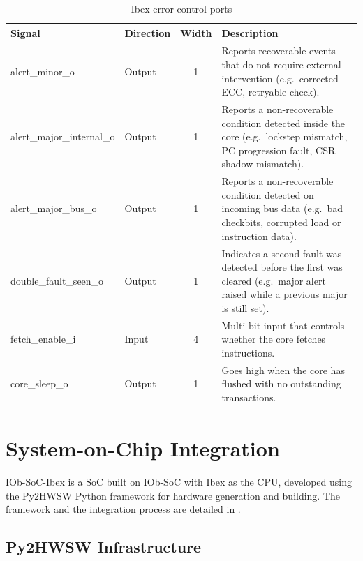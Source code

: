 \begin{table}[h]
\centering
\begin{tabularx}{\textwidth}{|l|l|c|X|}
\hline
\rowcolor{tableheader}\textbf{Signal} & \textbf{Direction} & \textbf{Width} & \textbf{Description} \\
\hline
\hline
alert\_minor\_o &
Output & 1 &
Reports recoverable events that do not require external intervention (e.g.\ corrected \ac{ECC}, retryable check). \\
\hline
alert\_major\_internal\_o &
Output & 1 &
Reports a non-recoverable condition detected inside the core (e.g.\ lockstep mismatch, \ac{PC} progression fault, \ac{CSR} shadow mismatch). \\
\hline
alert\_major\_bus\_o &
Output & 1 &
Reports a non-recoverable condition detected on incoming bus data (e.g.\ bad checkbits, corrupted load or instruction data). \\
\hline
double\_fault\_seen\_o &
Output & 1 &
Indicates a second fault was detected before the first was cleared (e.g.\ major alert raised while a previous major is still set). \\
\hline
fetch\_enable\_i &
Input & 4 &
Multi-bit input that controls whether the core fetches instructions. \\
\hline
core\_sleep\_o &
Output & 1 &
Goes high when the core has flushed with no outstanding transactions. \\
\hline
\end{tabularx}
\caption{Ibex error control ports}
\label{tab:ibex_error_ports}
\end{table}




\section{System-on-Chip Integration}
\label{chap5:soc-integration}

IOb-\ac{SoC}-Ibex is a \ac{SoC} built on IOb-\ac{SoC} with Ibex as the \ac{CPU}, developed using the Py2HWSW Python framework for hardware generation and building. The framework and the integration process are detailed in .





\subsection{Py2HWSW Infrastructure}
\label{chap5:py2hwsw}

